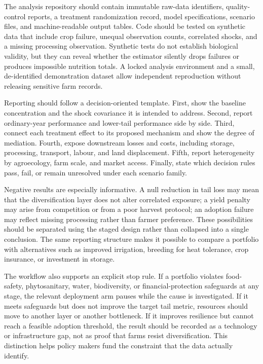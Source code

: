 \documentclass[conference]{IEEEtran}
\begin{document}
The analysis repository should contain immutable raw-data identifiers, quality-control reports, a treatment randomization record, model specifications, scenario files, and machine-readable output tables. Code should be tested on synthetic data that include crop failure, unequal observation counts, correlated shocks, and a missing processing observation. Synthetic tests do not establish biological validity, but they can reveal whether the estimator silently drops failures or produces impossible nutrition totals. A locked analysis environment and a small, de-identified demonstration dataset allow independent reproduction without releasing sensitive farm records.

Reporting should follow a decision-oriented template. First, show the baseline concentration and the shock covariance it is intended to address. Second, report ordinary-year performance and lower-tail performance side by side. Third, connect each treatment effect to its proposed mechanism and show the degree of mediation. Fourth, expose downstream losses and costs, including storage, processing, transport, labour, and land displacement. Fifth, report heterogeneity by agroecology, farm scale, and market access. Finally, state which decision rules pass, fail, or remain unresolved under each scenario family.

Negative results are especially informative. A null reduction in tail loss may mean that the diversification layer does not alter correlated exposure; a yield penalty may arise from competition or from a poor harvest protocol; an adoption failure may reflect missing processing rather than farmer preference. These possibilities should be separated using the staged design rather than collapsed into a single conclusion. The same reporting structure makes it possible to compare a portfolio with alternatives such as improved irrigation, breeding for heat tolerance, crop insurance, or investment in storage.

The workflow also supports an explicit stop rule. If a portfolio violates food-safety, phytosanitary, water, biodiversity, or financial-protection safeguards at any stage, the relevant deployment arm pauses while the cause is investigated. If it meets safeguards but does not improve the target tail metric, resources should move to another layer or another bottleneck. If it improves resilience but cannot reach a feasible adoption threshold, the result should be recorded as a technology or infrastructure gap, not as proof that farms resist diversification. This distinction helps policy makers fund the constraint that the data actually identify.
\end{document}
